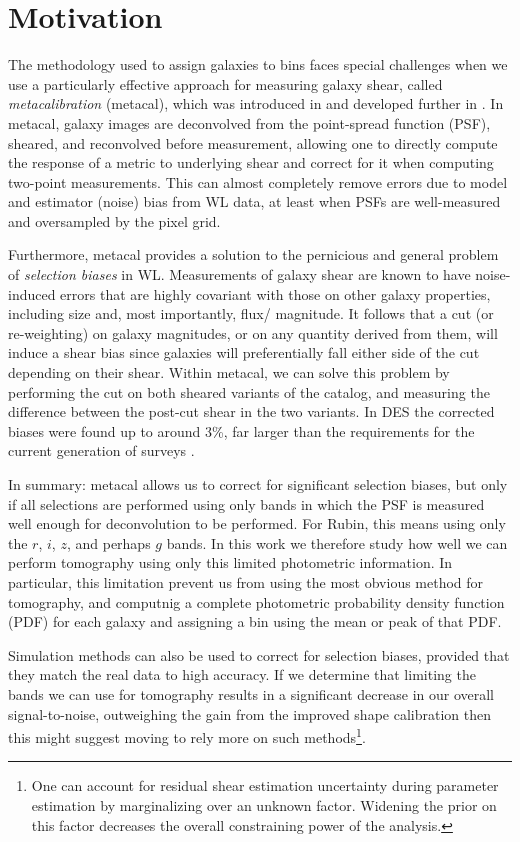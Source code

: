 \documentclass[twocolumn,twocolappendix]{aastex63}
\begin{document}
\section{Motivation}
\label{sec:motivation}

The methodology used to assign galaxies to bins faces special challenges when we use a particularly
effective approach for measuring galaxy shear, called \emph{metacalibration} (metacal),
which was introduced in \citet{sheldonhuff} and developed further in \citet{sheldon}.
In metacal, galaxy images are deconvolved from the point-spread function (PSF), sheared, and
reconvolved before measurement, allowing one to directly compute the response of a metric
to underlying shear and correct for it when computing two-point measurements.  This can
almost completely remove errors due to model and estimator (noise) bias from WL data, at least
when PSFs are well-measured and oversampled by the pixel grid.

Furthermore, metacal provides a solution to the pernicious and general problem of
\emph{selection biases} in WL.  Measurements of galaxy shear are known to have noise-induced errors
that are
highly covariant with those on other galaxy properties, including size and, most importantly, flux/
magnitude.  It follows that a cut (or re-weighting) on galaxy magnitudes, or on any quantity derived
from  them, will induce a shear bias since galaxies will preferentially fall either side of the cut
depending on their shear.  Within metacal, we can solve this problem by performing the cut on both
sheared variants of the catalog, and measuring the difference between the post-cut shear in the two
variants.  In DES the corrected biases were found up to around 3\%, far larger than
the requirements for the current generation of surveys \cite{des-y1-cat}.

In summary: metacal allows us to correct for significant selection biases, but only if all selections
are performed using only bands in which the PSF is measured well enough for deconvolution to be
performed.  For Rubin, this means using only the $r$, $i$, $z$, and perhaps $g$ bands.  In this work we
therefore study how well we can perform tomography using only this limited photometric information.  In
particular, this limitation prevent us from using the most obvious method for tomography,
and computnig a complete photometric probability density function (PDF) for each galaxy and assigning
a bin using the mean or peak of that PDF.

Simulation methods can also be used to correct for selection biases, provided that they match the
real data to high accuracy.  If we determine that limiting the bands we can use for tomography results
in a significant decrease in our overall signal-to-noise, outweighing the gain from the improved shape
calibration then this might suggest moving to rely more on such methods\footnote{One can account for
residual shear estimation uncertainty during parameter estimation by marginalizing over an unknown
factor.  Widening the prior on this factor decreases the overall constraining power of the analysis.}.
\end{document}
